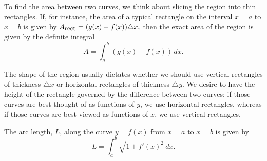 \begin{summary}
  \item To find the area between two curves, we think about slicing the region into thin rectangles.  If, for instance, the area of a typical rectangle on the interval $x = a$ to $x = b$ is given by $A_{\mbox{\small{rect}}} = (g(x) - f(x)) \triangle x,$ then the exact area of the region is given by the definite integral
  $$A = \int_a^b (g(x)-f(x))\, dx.$$
  \item The shape of the region usually dictates whether we should use vertical rectangles of thickness $\triangle x$ or horizontal rectangles of thickness $\triangle y$.  We desire to have the height of the rectangle governed by the difference between two curves:  if those curves are best thought of as functions of $y$, we use horizontal rectangles, whereas if those curves are best viewed as functions of $x$, we use vertical rectangles.
  \item The arc length, $L$, along the curve $y = f(x)$ from $x = a$ to $x = b$ is given by
$$L = \int_a^b \sqrt{1 + f'(x)^2} \, dx.$$
\end{summary}

\clearpage

 

\cleardoublepage